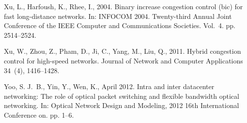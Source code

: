 \documentclass[preprint,3p,times,twocolumn,authoryear]{elsarticle}
\begin{document}
\begin{thebibliography}{46}
Xu, L., Harfoush, K., Rhee, I., 2004. Binary increase congestion control (bic)
  for fast long-distance networks. In: INFOCOM 2004. Twenty-third Annual Joint
  Conference of the IEEE Computer and Communications Societies. Vol.~4. pp.
  2514--2524.

Xu, W., Zhou, Z., Pham, D., Ji, C., Yang, M., Liu, Q., 2011. Hybrid congestion
  control for high-speed networks. Journal of Network and Computer Applications
  34~(4), 1416--1428.

Yoo, S. J.~B., Yin, Y., Wen, K., April 2012. Intra and inter datacenter
  networking: The role of optical packet switching and flexible bandwidth
  optical networking. In: Optical Network Design and Modeling, 2012 16th
  International Conference on. pp. 1--6.

\end{thebibliography}
\end{document}
